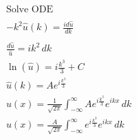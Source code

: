 \documentclass[letterpaper,11pt]{article}
\begin{document}
    \begin{gather*}
        \text{Solve ODE}\\\\
        -k^2 \hat{u}(k) = \frac{i d\hat{u}}{dk}\\\\
        \frac{d\hat{u}}{\hat{u}} = i k^2 \, dk \\
        \ln(\hat{u}) = i \frac{k^3}{3} + C\\
        \hat{u}(k) = Ae^{i \frac{k^3}{3}}\\
        u(x) = \frac{1}{\sqrt{2 \pi}} \int_{-\infty}^{\infty} A e^{i \frac{k^3}{3}} e^{ikx} \,dk\\
        u(x) = \frac{A}{\sqrt{2 \pi}} \int_{-\infty}^{\infty} e^{i \frac{k^3}{3}} e^{ikx} \,dk
    \end{gather*}
\end{document}
